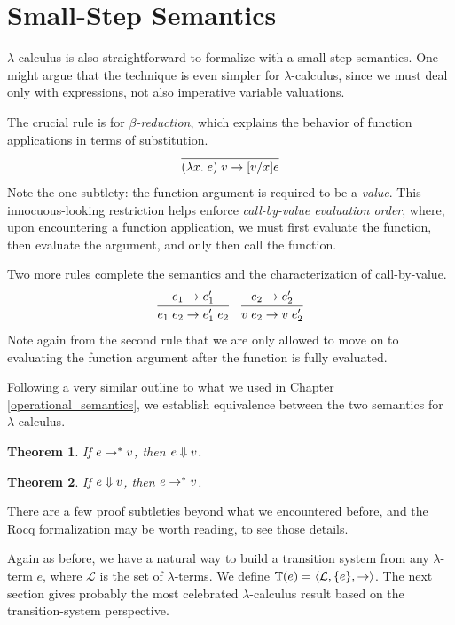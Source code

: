 \documentclass{amsbook}
\newtheorem{theorem}{Theorem}[chapter]
\theoremstyle{definition}
\theoremstyle{remark}
\numberwithin{section}{chapter}
\numberwithin{equation}{chapter}
\begin{document}
\section{Small-Step Semantics}

$\lambda$-calculus is also straightforward to formalize with a small-step semantics.
One might argue that the technique is even simpler for $\lambda$-calculus, since we must deal only with expressions, not also imperative variable valuations.

\encoding
The crucial rule is for \emph{$\beta$-reduction}, which explains the behavior of function applications in terms of substitution.
$$\infer{\smallstep{(\lambda x. \; e) \; v}{\subst{e}{x}{v}}}{}$$
Note the one subtlety: the function argument is required to be a \emph{value}.
This innocuous-looking restriction helps enforce \emph{call-by-value evaluation order}, where, upon encountering a function application, we must first evaluate the function, then evaluate the argument, and only then call the function.

Two more rules complete the semantics and the characterization of call-by-value.
$$\infer{\smallstep{e_1 \; e_2}{e'_1 \; e_2}}{
  \smallstep{e_1}{e'_1}
}
\quad \infer{\smallstep{v \; e_2}{v \; e'_2}}{
  \smallstep{e_2}{e'_2}
}$$
Note again from the second rule that we are only allowed to move on to evaluating the function argument after the function is fully evaluated.

Following a very similar outline to what we used in Chapter \ref{operational_semantics}, we establish equivalence between the two semantics for $\lambda$-calculus.

\begin{theorem}
  If $e \to^* v$, then $e \Downarrow v$.
\end{theorem}

\begin{theorem}
  If $e \Downarrow v$, then $e \to^* v$.
\end{theorem}

There are a few proof subtleties beyond what we encountered before, and the Rocq formalization may be worth reading, to see those details.

Again as before, we have a natural way to build a transition system from any $\lambda$-term $e$, where $\mathcal L$ is the set of $\lambda$-terms.
We define $\mathbb T(e) = {\left \langle \mathcal L, \{e\}, \to \right \rangle}$.
The next section gives probably the most celebrated $\lambda$-calculus result based on the transition-system perspective.
\end{document}
